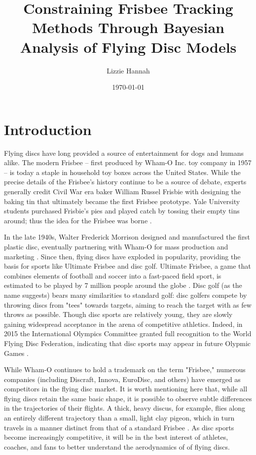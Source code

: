 \documentclass[a4paper,12pt, oneside]{article}
\title{Constraining Frisbee Tracking Methods Through Bayesian Analysis of Flying Disc Models}
\author{Lizzie Hannah}
\date{\today}
\begin{document}
\maketitle

\section{Introduction}

Flying discs have long provided a source of entertainment for dogs and humans alike.  The modern Frisbee -- first produced by Wham-O Inc. toy company in 1957 -- is today a staple in household toy boxes across the United States.  While the precise details of the Frisbee's history continue to be a source of debate, experts generally credit Civil War era baker William Russel Frisbie with designing the baking tin that ultimately became the first Frisbee prototype.  Yale University students purchased Frisbie's pies and played catch by tossing their empty tins around; thus the idea for the Frisbee was borne \cite{frisorigins}.  

In the late 1940s, Walter Frederick Morrison designed and manufactured the first plastic disc, eventually partnering with Wham-O for mass production and marketing \cite{frisorigins}. Since then, flying discs have exploded in popularity, providing the basis for sports like Ultimate Frisbee and disc golf. Ultimate Frisbee, a game that combines elements of football and soccer into a fast-paced field sport, is estimated to be played by 7 million people around the globe \cite{frisstats}.  Disc golf (as the name suggests) bears many similarities to standard golf: disc golfers compete by throwing discs from "tees" towards targets, aiming to reach the target with as few throws as possible. Though disc sports are relatively young, they are slowly gaining widespread acceptance in the arena of competitive athletics. Indeed, in 2015 the International Olympics Committee granted full recognition to the World Flying Disc Federation, indicating that disc sports may appear in future Olypmic Games \cite{iocrecognition}.

While Wham-O continues to hold a trademark on the term "Frisbee," numerous companies (including Discraft, Innova, EuroDisc, and others) have emerged as competitors in the flying disc market. It is worth mentioning here that, while all flying discs retain the same basic shape, it is possible to observe subtle differences in the trajectories of their flights.  A thick, heavy discus, for example, flies along an entirely different trajectory than a small, light clay pigeon, which in turn travels in a manner distinct from that of a standard Frisbee \cite{pottsandcrowther2007}. As disc sports become increasingly competitive, it will be in the best interest of athletes, coaches, and fans to better understand the aerodynamics of of flying discs.
\end{document}
